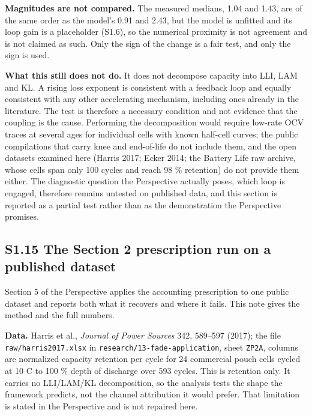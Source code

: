 \documentclass[11pt,a4paper]{article}
\begin{document}
\textbf{Magnitudes are not compared.} The measured medians, 1.04 and 1.43, are of the same order as the model's 0.91 and 2.43, but the model is unfitted and its loop gain is a placeholder (S1.6), so the numerical proximity is not agreement and is not claimed as such. Only the sign of the change is a fair test, and only the sign is used.


\textbf{What this still does not do.} It does not decompose capacity into LLI, LAM and KL. A rising loss exponent is consistent with a feedback loop and equally consistent with any other accelerating mechanism, including ones already in the literature. The test is therefore a necessary condition and not evidence that the coupling is the cause. Performing the decomposition would require low-rate OCV traces at several ages for individual cells with known half-cell curves; the public compilations that carry knee and end-of-life do not include them, and the open datasets examined here (Harris 2017; Ecker 2014; the Battery Life raw archive, whose cells span only 100 cycles and reach 98 \% retention) do not provide them either. The diagnostic question the Perspective actually poses, which loop is engaged, therefore remains untested on published data, and this section is reported as a partial test rather than as the demonstration the Perspective promises.


\subsection*{S1.15 The Section 2 prescription run on a published dataset}


Section 5 of the Perspective applies the accounting prescription to one public dataset and reports both what it recovers and where it fails. This note gives the method and the full numbers.


\textbf{Data.} Harris et al., \emph{Journal of Power Sources} 342, 589--597 (2017); the file \texttt{raw/harris2017}\hspace{0pt}\texttt{.xlsx} in \texttt{research/13-}\hspace{0pt}\texttt{fade-}\hspace{0pt}\texttt{application}, sheet \texttt{ZP2A}, columns are normalized capacity retention per cycle for 24 commercial pouch cells cycled at 10 C to 100 \% depth of discharge over 593 cycles. This is retention only. It carries no LLI/LAM/KL decomposition, so the analysis tests the shape the framework predicts, not the channel attribution it would prefer. That limitation is stated in the Perspective and is not repaired here.
\end{document}
